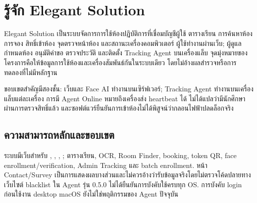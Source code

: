 \chapter{รู้จัก Elegant Solution}
Elegant Solution เป็นระบบจัดการการใช้ห้องปฏิบัติการที่เชื่อมบัญชีผู้ใช้ ตารางเรียน การค้นหาห้อง การจอง สิทธิ์เข้าห้อง จุดตรวจหน้าห้อง และสถานะเครื่องคอมพิวเตอร์ ผู้ใช้ทำงานผ่านเว็บ; ผู้ดูแลกำหนดห้อง อนุมัติคำขอ ตรวจประวัติ และติดตั้ง Tracking Agent บนเครื่องแล็บ จุดมุ่งหมายของโครงการคือให้ข้อมูลการใช้ห้องและเครื่องสัมพันธ์กันในระบบเดียว โดยไม่อ้างผลสำรวจหรือการทดลองที่ไม่มีหลักฐาน

ขอบเขตสำคัญมีสองชั้น: เว็บและ Face AI ทำงานบนเซิร์ฟเวอร์; Tracking Agent ทำงานบนเครื่องแล็บแต่ละเครื่อง การมี Agent Online หมายถึงเครื่องส่ง heartbeat ได้ ไม่ได้แปลว่ามีนักศึกษาผ่านการตรวจสิทธิ์แล้ว และซอฟต์แวร์ยืนยันการเข้าห้องไม่ได้พิสูจน์ว่ากลอนไฟฟ้าปลดล็อกจริง
\section*{ความสามารถหลักและขอบเขต}
ระบบมีเว็บสำหรับ , , , ; ตารางเรียน, OCR, Room Finder, booking, token QR, face enrollment/verification, Admin Tracking และ batch enrollment. หน้า Contact/Survey เป็นการแสดงผลบางส่วนและไม่ควรอ้างว่ารับข้อมูลจริงโดยไม่ตรวจโค้ดปลายทาง เว็บไซต์ blacklist ใน Agent รุ่น 0.5.0 ไม่ได้ยืนยันการบังคับใช้ครบทุก OS. การบังคับ login ก่อนใช้งาน desktop macOS ยังไม่ใช่พฤติกรรมของ Agent ปัจจุบัน

